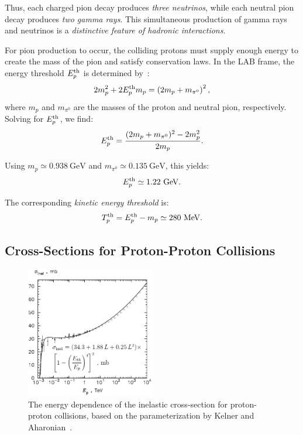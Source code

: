 Thus, each charged pion decay produces \emph{three neutrinos}, while each neutral pion decay produces \emph{two gamma rays}. This simultaneous production of gamma rays and neutrinos is a \emph{distinctive feature of hadronic interactions}.

For pion production to occur, the colliding protons must supply enough energy to create the mass of the pion and satisfy conservation laws. In the LAB frame, the energy threshold \(E_p^{\rm th}\) is determined by~:
%
\begin{equation}
2 m_p^2 + 2 E^{\rm th}_p m_p = \left(2 m_p + m_{\pi^0} \right)^2,
\end{equation}
%
where \(m_p\) and \(m_{\pi^0}\) are the masses of the proton and neutral pion, respectively. Solving for \(E_p^{\rm th}\), we find:
%
\begin{equation}
E_p^{\rm th} = \frac{(2 m_p + m_{\pi^0})^2 - 2 m_p^2}{2 m_p}.
\end{equation}

Using \(m_p \simeq 0.938~\text{GeV}\) and \(m_{\pi^0} \simeq 0.135~\text{GeV}\), this yields:
\begin{equation}
E_p^{\rm th} \simeq 1.22~\text{GeV}.
\end{equation}

The corresponding \emph{kinetic energy threshold} is:
\begin{equation}
T_p^{\rm th} = E_p^{\rm th} - m_p \simeq 280~\text{MeV}.
\end{equation}

\subsection{Cross-Sections for Proton-Proton Collisions}

\begin{figure}[t] \centering \includegraphics[width=0.5\textwidth]{figures/KelnerAharonian11.pdf} \caption{The energy dependence of the inelastic cross-section for proton-proton collisions, based on the parameterization by Kelner and Aharonian~\cite{Kelner2006prd}.} \label{fig:ppin} \end{figure}

